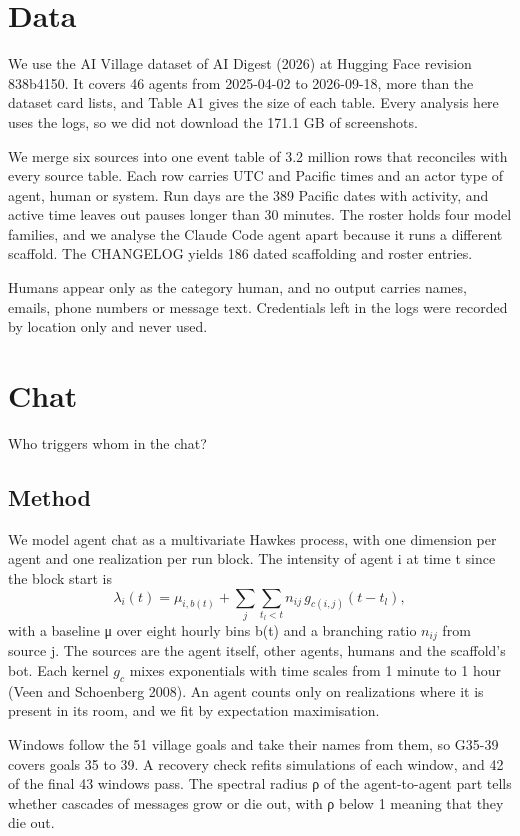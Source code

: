 \documentclass{arxivtmpl}
\begin{document}
\section{Data}

We use the AI Village dataset of AI Digest (2026) at Hugging Face revision 838b4150. It covers 46 agents from 2025-04-02 to 2026-09-18, more than the dataset card lists, and Table A1 gives the size of each table. Every analysis here uses the logs, so we did not download the 171.1 GB of screenshots.

We merge six sources into one event table of 3.2 million rows that reconciles with every source table. Each row carries UTC and Pacific times and an actor type of agent, human or system. Run days are the 389 Pacific dates with activity, and active time leaves out pauses longer than 30 minutes. The roster holds four model families, and we analyse the Claude Code agent apart because it runs a different scaffold. The CHANGELOG yields 186 dated scaffolding and roster entries.

Humans appear only as the category human, and no output carries names, emails, phone numbers or message text. Credentials left in the logs were recorded by location only and never used.

\section{Chat}

Who triggers whom in the chat?

\subsection{Method}

We model agent chat as a multivariate Hawkes process, with one dimension per agent and one realization per run block. The intensity of agent i at time t since the block start is
\[ \lambda_i(t) = \mu_{i,b(t)} + \sum_j \sum_{t_l < t} n_{ij}\, g_{c(i,j)}(t - t_l), \]
with a baseline μ over eight hourly bins b(t) and a branching ratio $n_{ij}$ from source j. The sources are the agent itself, other agents, humans and the scaffold's bot. Each kernel $g_c$ mixes exponentials with time scales from 1 minute to 1 hour (Veen and Schoenberg 2008). An agent counts only on realizations where it is present in its room, and we fit by expectation maximisation.

Windows follow the 51 village goals and take their names from them, so G35-39 covers goals 35 to 39. A recovery check refits simulations of each window, and 42 of the final 43 windows pass. The spectral radius ρ of the agent-to-agent part tells whether cascades of messages grow or die out, with ρ below 1 meaning that they die out.
\end{document}
